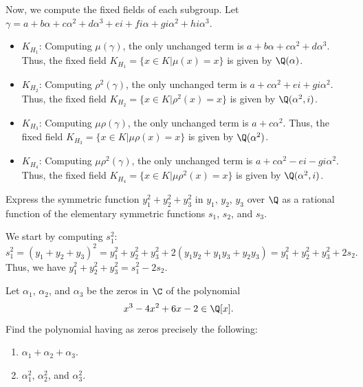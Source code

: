 \begin{solution}
  Now, we compute the fixed fields of each subgroup. Let $\gamma = a + b\alpha + c\alpha^2 + d\alpha^3 + ei + fi\alpha + gi\alpha^2 + hi\alpha^3$.
  \begin{itemize}
    \item $K_{H_1}$: Computing $\mu(\gamma)$, the only unchanged term is $a + b\alpha + c\alpha^2 + d\alpha^3$. Thus, the fixed field $K_{H_1} = \{x \in K | \mu(x) = x\}$ is given by $\Q(\alpha)$.
    \item $K_{H_2}$: Computing $\rho^2(\gamma)$, the only unchanged term is $a + c\alpha^2 + ei + gi\alpha^2$. Thus, the fixed field $K_{H_2} = \{x \in K | \rho^2(x) = x\}$ is given by $\Q(\alpha^2, i)$.
    \item $K_{H_3}$: Computing $\mu\rho(\gamma)$, the only unchanged term is $a + c\alpha^2$. Thus, the fixed field $K_{H_3} = \{x \in K | \mu\rho(x) = x\}$ is given by $\Q(\alpha^2)$.
    \item $K_{H_4}$: Computing $\mu\rho^2(\gamma)$, the only unchanged term is $a + c\alpha^2 - ei - gi\alpha^2$. Thus, the fixed field $K_{H_4} = \{x \in K | \mu\rho^2(x) = x\}$ is given by $\Q(\alpha^2, i)$.
  \end{itemize}
\end{solution}

\begin{problem}[47.9(i)]
  Express the symmetric function $y_1^2 + y_2^2 + y_3^2$ in $y_1$, $y_2$, $y_3$ over $\Q$ as a rational function of the elementary symmetric functions $s_1$, $s_2$, and $s_3$.
\end{problem}

\begin{solution}
  We start by computing $s_1^2$:
  \[%
    s_1^2 = (y_1 + y_2 + y_3)^2 = y_1^2 + y_2^2 + y_3^2 + 2(y_1y_2 + y_1y_3 + y_2y_3) = y_1^2 + y_2^2 + y_3^2 + 2s_2
  .\]%
  Thus, we have $y_1^2 + y_2^2 + y_3^2 = s_1^2 - 2s_2$.
\end{solution}

\begin{problem}[47.10]
  Let $\alpha_1$, $\alpha_2$, and $\alpha_3$ be the zeros in $\C$ of the polynomial
  \[%
    x^3 - 4x^2 + 6x - 2 \in \Q[x]
  .\]%
  Find the polynomial having as zeros precisely the following:
  \begin{enumerate}
    \item $\alpha_1 + \alpha_2 + \alpha_3$.
    \item $\alpha_1^2$, $\alpha_2^2$, and $\alpha_3^2$.
  \end{enumerate}
\end{problem}

